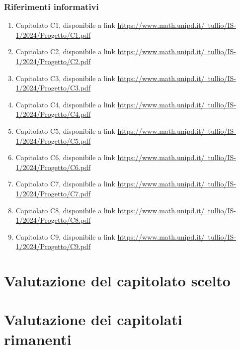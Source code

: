     \subsubsection{Riferimenti informativi}
        \begin{enumerate}
        
            \item Capitolato C1, disponibile a link \href{https://www.math.unipd.it/~tullio/IS-1/2024/Progetto/C1.pdf}{https://www.math.unipd.it/~tullio/IS-1/2024/Progetto/C1.pdf}
            \item Capitolato C2, disponibile a link \href{https://www.math.unipd.it/~tullio/IS-1/2024/Progetto/C2.pdf}{https://www.math.unipd.it/~tullio/IS-1/2024/Progetto/C2.pdf}
            \item Capitolato C3, disponibile a link \href{https://www.math.unipd.it/~tullio/IS-1/2024/Progetto/C3.pdf}{https://www.math.unipd.it/~tullio/IS-1/2024/Progetto/C3.pdf}
            \item Capitolato C4, disponibile a link \href{https://www.math.unipd.it/~tullio/IS-1/2024/Progetto/C4.pdf}{https://www.math.unipd.it/~tullio/IS-1/2024/Progetto/C4.pdf}
            \item Capitolato C5, disponibile a link \href{https://www.math.unipd.it/~tullio/IS-1/2024/Progetto/C5.pdf}{https://www.math.unipd.it/~tullio/IS-1/2024/Progetto/C5.pdf}
            \item Capitolato C6, disponibile a link \href{https://www.math.unipd.it/~tullio/IS-1/2024/Progetto/C6.pdf}{https://www.math.unipd.it/~tullio/IS-1/2024/Progetto/C6.pdf}
            \item Capitolato C7, disponibile a link \href{https://www.math.unipd.it/~tullio/IS-1/2024/Progetto/C7.pdf}{https://www.math.unipd.it/~tullio/IS-1/2024/Progetto/C7.pdf}
            \item Capitolato C8, disponibile a link \href{https://www.math.unipd.it/~tullio/IS-1/2024/Progetto/C8.pdf}{https://www.math.unipd.it/~tullio/IS-1/2024/Progetto/C8.pdf}
            \item Capitolato C9, disponibile a link \href{https://www.math.unipd.it/~tullio/IS-1/2024/Progetto/C9.pdf}{https://www.math.unipd.it/~tullio/IS-1/2024/Progetto/C9.pdf}
        \end{enumerate}

\section{Valutazione del capitolato scelto}



\section{Valutazione dei capitolati rimanenti}







